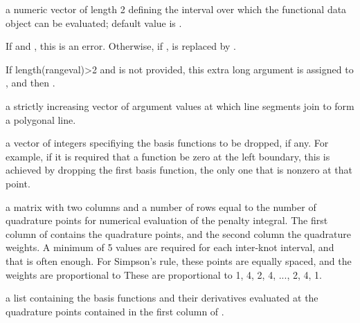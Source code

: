 \documentclass{article}
\begin{document}
\begin{Arguments}
\begin{ldescription}
\item[\code{rangeval}] a numeric vector of length 2 defining the interval over which the
functional data object can be evaluated;  default value is
.

If  and , this is an
error.  Otherwise, if , 
is replaced by .

If length(rangeval)>2 and  is not provided, this extra
long  argument is assigned to , and
then .

\item[\code{argvals}] a strictly increasing vector of argument values at which line
segments join to form a polygonal line.

\item[\code{dropind}] a vector of integers specifiying the basis functions to
be dropped, if any.  For example, if it is required that
a function be zero at the left boundary, this is achieved
by dropping the first basis function, the only one that
is nonzero at that point.

\item[\code{quadvals}] a matrix with two columns and a number of rows equal to the number
of quadrature points for numerical evaluation of the penalty
integral.  The first column of  contains the
quadrature points, and the second column the quadrature weights.  A
minimum of 5 values are required for each inter-knot interval, and
that is often enough.  For Simpson's rule, these points are equally
spaced, and the weights are proportional to These are proportional
to 1, 4, 2, 4, ..., 2, 4, 1.

\item[\code{values}] a list containing the basis functions and their derivatives
evaluated at the quadrature points contained in the first
column of .


\end{ldescription}
\end{Arguments}
\end{document}
